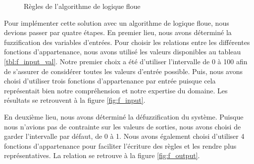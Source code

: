 \documentclass[12pt,letterpaper]{article}
\begin{document}
\begin{figure}
    \quad

    \caption{Règles de l'algorithme de logique floue}
    \label{fig:f_rule}
\end{figure}


Pour implémenter cette solution avec un algorithme de logique floue, nous devions passer par quatre étapes. En premier lieu, nous avons déterminé la fuzzification des variables d'entrées. Pour choisir les relations entre les différentes fonctions d'appartenance, nous avons utilisé les valeurs disponibles au tableau \ref{tbl:f_input_val}. Notre premier choix a été d'utiliser l'intervalle de 0 à 100 afin de s'assurer de considérer toutes les valeurs d'entrée possible. Puis, nous avons choisi d'utiliser trois fonctions d'appartenance par entrée puisque cela représentait bien notre compréhension et notre expertise du domaine. Les résultats se retrouvent à la figure \ref{fig:f_input}.

En deuxième lieu, nous avons déterminé la défuzzification du système. Puisque nous n'avions pas de contrainte sur les valeurs de sorties, nous avons choisi de garder l'intervalle par défaut, de 0 à 1. Nous avons également choisi d'utiliser 4 fonctions d'appartenance pour faciliter l'écriture des règles et les rendre plus représentatives. La relation se retrouve à la figure \ref{fig:f_output}.
\end{document}
